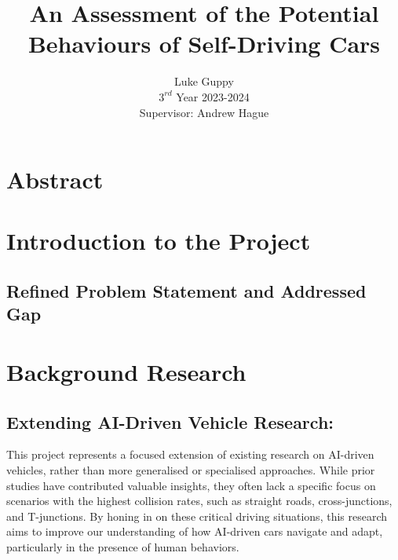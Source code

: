 \documentclass{article}
\title{\LARGE\bfseries An Assessment of the Potential Behaviours of Self-Driving Cars}
\author{Luke Guppy \\
$3^{rd}$ Year 2023-2024 \\
Supervisor: Andrew Hague}
\date{}
\begin{document}
\maketitle

\newpage
\tableofcontents
\newpage

\section{Abstract}
\lipsum[2][1]

\section{Introduction to the Project}
\lipsum[2][1]

\subsection{Refined Problem Statement and Addressed Gap}
\lipsum[2][1]


\section{Background Research}
\lipsum[2][1]

\subsection{Extending AI-Driven Vehicle Research:}
This project represents a focused extension of existing research on AI-driven vehicles, rather than more generalised or specialised approaches. While prior studies have contributed valuable insights, they often lack a specific focus on scenarios with the highest collision rates, such as straight roads, cross-junctions, and T-junctions. By honing in on these critical driving situations, this research aims to improve our understanding of how AI-driven cars navigate and adapt, particularly in the presence of human behaviors. 
\end{document}
